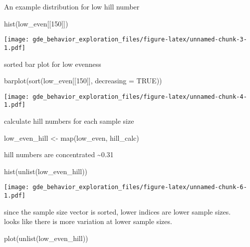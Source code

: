 \documentclass[
]{article}
\newenvironment{Shaded}{\begin{snugshade}}{\end{snugshade}}
\newcommand{\AttributeTok}[1]{\textcolor[rgb]{0.77,0.63,0.00}{#1}}
\newcommand{\ConstantTok}[1]{\textcolor[rgb]{0.00,0.00,0.00}{#1}}
\newcommand{\DecValTok}[1]{\textcolor[rgb]{0.00,0.00,0.81}{#1}}
\newcommand{\FunctionTok}[1]{\textcolor[rgb]{0.00,0.00,0.00}{#1}}
\newcommand{\NormalTok}[1]{#1}
\newcommand{\OtherTok}[1]{\textcolor[rgb]{0.56,0.35,0.01}{#1}}
\begin{document}
An example distribution for low hill number

\begin{Shaded}
\begin{Highlighting}[]
\FunctionTok{hist}\NormalTok{(low\_even[[}\DecValTok{150}\NormalTok{]])}
\end{Highlighting}
\end{Shaded}

\texttt{[image: gde\_behavior\_exploration\_files/figure-latex/unnamed-chunk-3-1.pdf]}

sorted bar plot for low evenness

\begin{Shaded}
\begin{Highlighting}[]
\FunctionTok{barplot}\NormalTok{(}\FunctionTok{sort}\NormalTok{(low\_even[[}\DecValTok{150}\NormalTok{]], }\AttributeTok{decreasing =} \ConstantTok{TRUE}\NormalTok{))}
\end{Highlighting}
\end{Shaded}

\texttt{[image: gde\_behavior\_exploration\_files/figure-latex/unnamed-chunk-4-1.pdf]}

calculate hill numbers for each sample size

\begin{Shaded}
\begin{Highlighting}[]
\NormalTok{low\_even\_hill }\OtherTok{\textless{}{-}} \FunctionTok{map}\NormalTok{(low\_even, hill\_calc)}
\end{Highlighting}
\end{Shaded}

hill numbers are concentrated \textasciitilde0.31

\begin{Shaded}
\begin{Highlighting}[]
\FunctionTok{hist}\NormalTok{(}\FunctionTok{unlist}\NormalTok{(low\_even\_hill))}
\end{Highlighting}
\end{Shaded}

\texttt{[image: gde\_behavior\_exploration\_files/figure-latex/unnamed-chunk-6-1.pdf]}

since the sample size vector is sorted, lower indices are lower sample
sizes.\\
looks like there is more variation at lower sample sizes.

\begin{Shaded}
\begin{Highlighting}[]
\FunctionTok{plot}\NormalTok{(}\FunctionTok{unlist}\NormalTok{(low\_even\_hill))}
\end{Highlighting}
\end{Shaded}
\end{document}

